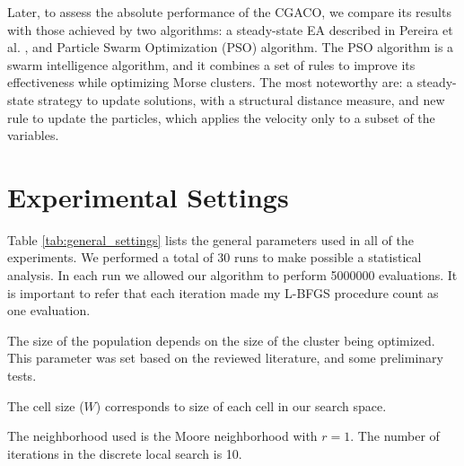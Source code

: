 	Later, to assess the absolute performance of the CGACO, we compare its results with those achieved by two algorithms: a steady-state EA described in Pereira et al. \cite{xico09}, and Particle Swarm Optimization (PSO) algorithm. The PSO algorithm is a swarm intelligence algorithm, and it combines a set of rules to improve its effectiveness while optimizing Morse clusters. The most noteworthy are: a steady-state strategy to update solutions, with a structural distance measure, and new rule to update the particles, which applies the velocity only to a subset of the variables.
	
\section{Experimental Settings}
\label{sec:experimental_setting}

Table \ref{tab:general_settings} lists the general parameters used in all of the experiments. We performed a total of 30 runs to make possible a statistical analysis. In each run we allowed our algorithm to perform 5000000 evaluations. It is important to refer that each iteration made my L-BFGS procedure count as one evaluation. 

The size of the population depends on the size of the cluster being optimized. This parameter was set based on the reviewed literature, and some preliminary tests. 

The cell size ($W$) corresponds to size of each cell in our search space. 

The neighborhood used is the Moore neighborhood with $r = 1$. The number of iterations in the discrete local search is 10.

